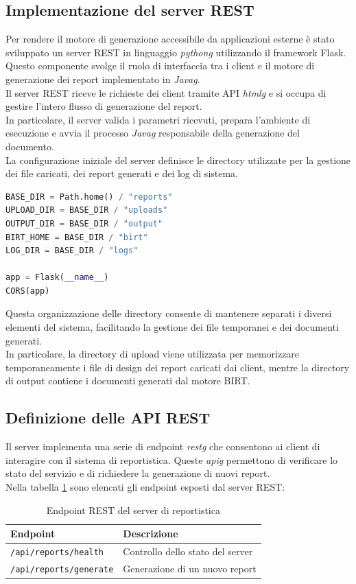 \subsection{Implementazione del server REST}
Per rendere il motore di generazione accessibile da applicazioni esterne è stato sviluppato un server REST in linguaggio \emph{\gls{pythong}} utilizzando il framework Flask. \\
Questo componente svolge il ruolo di interfaccia tra i client e il motore di generazione dei report implementato in \emph{\gls{Javag}}.\\
Il server REST riceve le richieste dei client tramite API \emph{\gls{htmlg}} e si occupa di gestire l'intero flusso di generazione del report. \\
In particolare, il server valida i parametri ricevuti, prepara l'ambiente di esecuzione e avvia il processo \emph{\gls{Javag}} responsabile della generazione del documento.\\
La configurazione iniziale del server definisce le directory utilizzate per la gestione dei file caricati, dei report generati e dei log di sistema.

\begin{lstlisting}[language=Python]
BASE_DIR = Path.home() / "reports"
UPLOAD_DIR = BASE_DIR / "uploads"
OUTPUT_DIR = BASE_DIR / "output"
BIRT_HOME = BASE_DIR / "birt"
LOG_DIR = BASE_DIR / "logs"

app = Flask(__name__)
CORS(app)
\end{lstlisting}

Questa organizzazione delle directory consente di mantenere separati i diversi elementi del sistema, facilitando la gestione dei file temporanei e dei documenti generati. \\
In particolare, la directory di upload viene utilizzata per memorizzare temporaneamente i file di design dei report caricati dai client, mentre la directory di output contiene i documenti generati dal motore BIRT.

\subsection{Definizione delle API REST}
Il server implementa una serie di endpoint \emph{\gls{restg}} che consentono ai client di interagire con il sistema di reportistica. Queste \emph{\gls{apig}} permettono di verificare lo stato del servizio e di richiedere la generazione di nuovi report.\\
Nella tabella \ref{tab:API-endpoints} sono elencati gli endpoint esposti dal server REST:
\begin{table}[H]
\centering
\begin{tabular}{|l|l|}
\hline
\rowcolor{gray!40}
\textbf{Endpoint} & \textbf{Descrizione} \\ \hline
\texttt{/api/reports/health} & Controllo dello stato del server \\ \hline
\texttt{/api/reports/generate} & Generazione di un nuovo report \\ \hline
\end{tabular}
\caption{Endpoint REST del server di reportistica}
\label{tab:API-endpoints}
\end{table}

